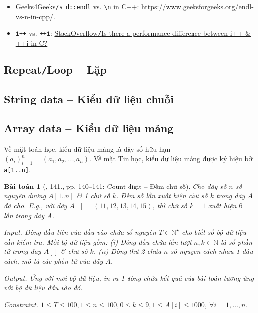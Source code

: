 \documentclass{article}
\newtheorem{baitoan}{Bài toán}
\begin{document}
\begin{itemize}
	\item Geeks4Geeks{\tt/std::endl} vs. \verb|\n| in C++: \url{https://www.geeksforgeeks.org/endl-vs-n-in-cpp/}. 
	\item {\tt i++} vs. {\tt++i}: \href{https://stackoverflow.com/questions/24886/is-there-a-performance-difference-between-i-and-i-in-c}{StackOverflow{\tt/}Is there a performance difference between i++ \& ++i in C?}
\end{itemize}

\subsection{Repeat{\tt/}Loop -- Lặp}

\subsection{String data -- Kiểu dữ liệu chuỗi}


\subsection{Array data -- Kiểu dữ liệu mảng}
Về mặt toán học, kiểu dữ liệu mảng là dãy số hữu hạn $(a_i)_{i=1}^n = (a_1,a_2,\ldots,a_n)$. Về mặt Tin học, kiểu dữ liệu mảng được ký hiệu bởi {\tt a[1..n]}.

\begin{baitoan}[\cite{Duc_200_BT_Python}, 141., pp. 140--141: Count digit -- Đếm chữ số]
	Cho dãy số $n$ số nguyên dương $A[1..n]$ \& 1 chữ số $k$. Đếm số lần xuất hiện chữ số $k$ trong dãy $A$ đã cho. E.g., với dãy $A[] = (11,12,13,14,15)$, thì chữ số $k = 1$ xuất hiện $6$ lần trong dãy $A$.
	\item {\sf Input.} Dòng đầu tiên của đầu vào chứa số nguyên $T\in\mathbb{N}^\star$ cho biết số bộ dữ liệu cần kiểm tra. Mỗi bộ dữ liệu gồm: (i) Dòng đầu chứa lần lượt $n,k\in\mathbb{N}$ là số phần tử trong dãy $A[]$ \& chữ số $k$. (ii) Dòng thứ 2 chứa $n$ số nguyên cách nhau 1 dấu cách, mô tả các phần tử của dãy $A$.
	\item {\sf Output.} Ứng với mỗi bộ dữ liệu, in ra 1 dòng chứa kết quả của bài toán tương ứng với bộ dữ liệu đầu vào đó.
	\item {\sf Constraint.} $1\le T\le100,1\le n\le100,0\le k\le9,1\le A[i]\le1000$, $\forall i = 1,\ldots,n$.
\end{baitoan}
\end{document}
